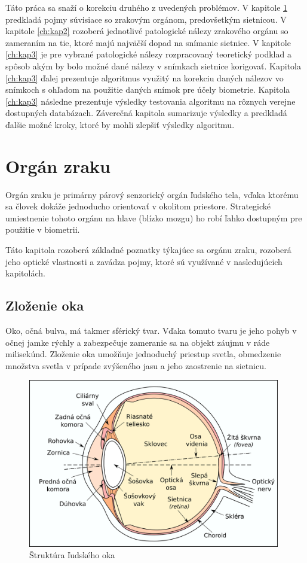 Táto práca sa snaží o korekciu druhého z uvedených problémov. V kapitole \ref{ch:kap1} predkladá pojmy súvisiace so zrakovým orgánom, predovšetkým sietnicou. V kapitole \ref{ch:kap2} rozoberá jednotlivé patologické nálezy zrakového orgánu so zameraním na tie, ktoré majú najväčší dopad na snímanie sietnice. V kapitole \ref{ch:kap3} je pre vybrané patologické nálezy rozpracovaný teoretický podklad a spôsob akým by bolo možné dané nálezy v snímkach sietnice korigovať. Kapitola \ref{ch:kap3} ďalej prezentuje algoritmus využitý na korekciu daných nálezov vo snímkoch s ohľadom na použitie daných snímok pre účely biometrie. Kapitola \ref{ch:kap3} následne prezentuje výsledky testovania algoritmu na rôznych verejne dostupných databázach. Záverečná kapitola sumarizuje výsledky a predkladá ďalšie možné kroky, ktoré by mohli zlepšiť výsledky algoritmu.

\chapter{Orgán zraku}\label{ch:kap1}
Orgán zraku je primárny párový senzorický orgán ľudského tela, vďaka ktorému sa človek dokáže jednoducho orientovať v okolitom priestore. Strategické umiestnenie tohoto orgánu na hlave (blízko mozgu) ho robí ľahko dostupným pre použitie v biometrii.

Táto kapitola rozoberá základné poznatky týkajúce sa orgánu zraku, rozoberá jeho optické vlastnosti a zavádza pojmy, ktoré sú využívané v nasledujúcich kapitolách.

\section{Zloženie oka}\label{sec:oko}
Oko, očná bulva, má takmer sférický tvar. Vďaka tomuto tvaru je jeho pohyb v očnej jamke rýchly a zabezpečuje zameranie sa na objekt záujmu v ráde milisekúnd\cite{}.
Zloženie oka umožňuje jednoduchý priestup svetla, obmedzenie množstva svetla v prípade zvýšeného jasu a jeho zaostrenie na sietnicu.

\begin{figure}[h]
  \centering
  \includegraphics[width=11cm]{img/Eyesection.png}
  \caption{Štruktúra ľudského oka\cite{retina}}
\end{figure}

